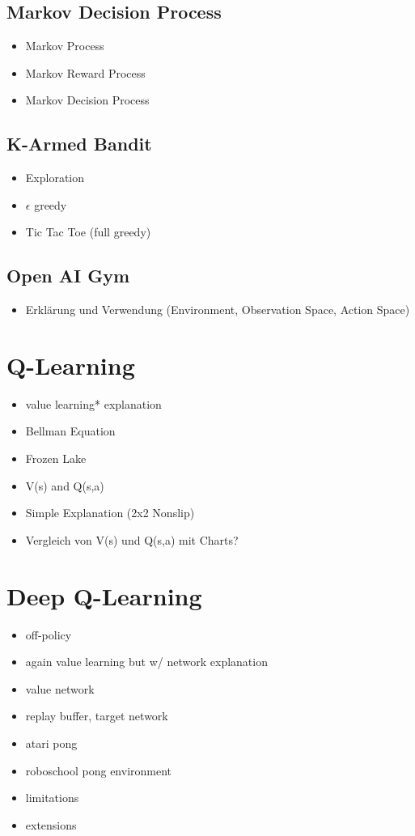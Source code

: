 \documentclass[11pt]{scrartcl}
\begin{document}
\subsection{Markov Decision Process}
\begin{itemize}
\item Markov Process
\item Markov Reward Process
\item Markov Decision Process 
\end{itemize}
\subsection{K-Armed Bandit}
\begin{itemize}
\item Exploration
\item $\epsilon$ greedy
\item Tic Tac Toe (full greedy)
\end{itemize}
\subsection{Open AI Gym}
\begin{itemize}
\item Erklärung und Verwendung (Environment, Observation Space, Action Space) 
\end{itemize}
\section{Q-Learning}
\begin{itemize}
\item value learning* explanation
\item Bellman Equation
\item Frozen Lake
\item V(s) and Q(s,a)
\item Simple Explanation (2x2 Nonslip)
\item Vergleich von V(s) und Q(s,a) mit Charts?
\end{itemize}
\section{Deep Q-Learning}
\begin{itemize}
\item off-policy
\item again value learning but w/ network explanation
\item value network
\item replay buffer, target network
\item atari pong
\item roboschool pong environment
\item limitations
\item extensions
\end{itemize}
\end{document}
